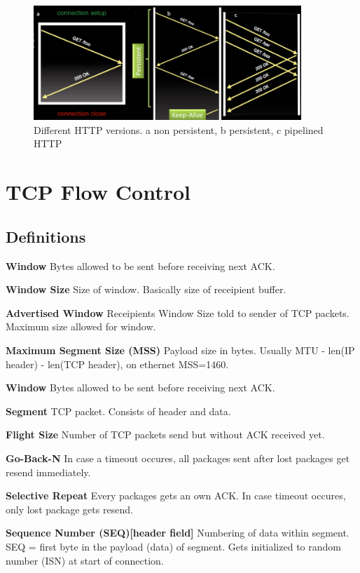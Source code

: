 \documentclass{article}
\begin{document}
\begin{figure}[h]
    \centering
    \includegraphics[width=0.9\textwidth]{media/http.png}
    \caption{Different HTTP versions. a non persistent, b persistent, c pipelined HTTP}
    \label{fig:pipe_http}
\end{figure}

\pagebreak

\section{TCP Flow Control}
\subsection{Definitions}
\label{sbsec:flow_defs}
\textbf{Window}
Bytes allowed to be sent before receiving next ACK.


\textbf{Window Size}
Size of window. Basically size of receipient buffer.

\textbf{Advertised Window}
Receipients Window Size told to sender of TCP packets. Maximum size allowed for window.

\textbf{Maximum Segment Size (MSS)}
Payload size in bytes. Usually MTU - len(IP header) - len(TCP header), on ethernet MSS=1460.

\textbf{Window}
Bytes allowed to be sent before receiving next ACK.

\textbf{Segment}
TCP packet. Consists of header and data.

\textbf{Flight Size}
Number of TCP packets send but without ACK received yet.

\textbf{Go-Back-N}
In case a timeout occures, all packages sent after lost packages get resend immediately. 

\textbf{Selective Repeat}
Every packages gets an own ACK. In case timeout occures, only lost package gets resend.

\textbf{Sequence Number (SEQ)[header field]}
Numbering of data within segment. SEQ = first byte in the payload (data) of segment. Gets initialized to random number (ISN) at start of connection.
\end{document}
